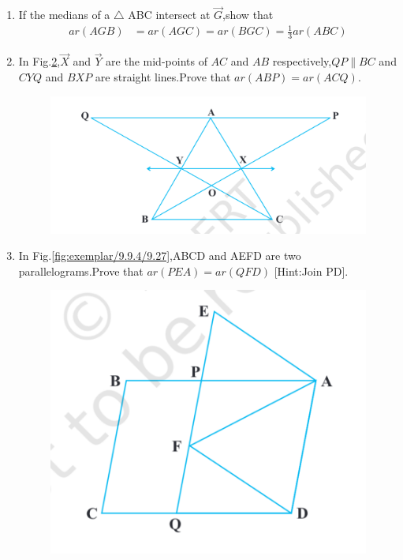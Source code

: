 \begin{enumerate}[label=\arabic*.,ref=\thesubsection.\theenumi]
\begin{figure}[h]
	\caption{}
	\label{fig:exemplar/9.9.4/9.25}
\end{figure}
\item If the medians of a $ \triangle$ ABC  intersect at $\vec{G}$,show that
	\begin{align} 
		{ar (AGB)} &={ar (AGC)}= {ar (BGC)} = \frac{1}{3} {ar (ABC)}
	\end{align}
\item In Fig.\ref{fig:exemplar/9.9.4/9.26},$\vec{X}$ and $\vec{Y}$ are the mid-points of $AC$ and $AB$ respectively,$QP \parallel BC$ and $CYQ$ and $BXP$ are straight lines.Prove that $ ar (ABP) = ar (ACQ) $.
\begin{figure}[h]
	\centering
	\includegraphics[width=\columnwidth]{exemplar/9.9.4/figs/Fig9.26.png}
	\caption{}
	\label{fig:exemplar/9.9.4/9.26}
\end{figure}
\item In Fig.\ref{fig:exemplar/9.9.4/9.27},ABCD and AEFD are two parallelograms.Prove that $ ar (PEA) = ar (QFD) $ [Hint:Join PD].
\begin{figure}[h]
	\centering
	\includegraphics[width=\columnwidth]{exemplar/9.9.4/figs/Fig9.27.png}

\end{figure}
\end{enumerate}
